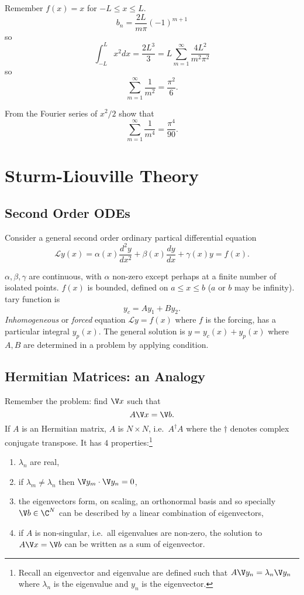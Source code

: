 \documentclass[a4paper]{article}
\renewcommand*{\L}{\mathcal{L}}
\begin{document}
\begin{eg}
  Remember \(f(x)=x\) for \(-L\leq x\leq L\).
  \[
    b_n = \frac{2L}{m\pi}(-1)^{m+1}
  \]
  so
  \[
    \int_{-L}^{L} x^2 dx = \frac{2L^3}{3} = L \sum_{m=1}^{\infty}\frac{4L^2}{m^2\pi^2}
  \]
  so
  \[
    \sum_{m=1}^{\infty}\frac{1}{m^2} = \frac{\pi^2}{6}.
  \]
\end{eg}

\begin{ex}
  From the Fourier series of \(x^2/2\) show that
  \[
    \sum_{m=1}^{\infty}\frac{1}{m^4} = \frac{\pi^4}{90}.
  \]
\end{ex}

\section{Sturm-Liouville Theory}

\subsection{Second Order ODEs}

Consider a general second order ordinary partical differential equation
\[
  \L y(x) = \alpha(x) \frac{d^2y}{dx^2} + \beta(x) \frac{dy}{dx} + \gamma(x) y = f(x).
\]

\(\alpha,\beta,\gamma\) are continuous, with \(\alpha\) non-zero except perhaps at a finite number of isolated points. \(f(x)\) is bounded, defined on \(a\leq x\leq b\) (\(a\) or \(b\) may be infinity).
tary function is \[
  y_c=Ay_1+By_2.
\]
\emph{Inhomogeneous} or \emph{forced} equation \(\L y = f(x)\) where \(f\) is the forcing, has a particular integral \(y_p(x)\). The general solution is \(y=y_c(x)+y_p(x)\) where \(A,B\) are determined in a problem by applying condition.

\subsection{Hermitian Matrices: an Analogy}

Remember the problem: find \(\V x \) such that
\[
A \V x = \V b.
\]
If \(A\) is an Hermitian matrix, \(A\) is \(N \times N\), i.e.\ \(A^\dag A\) where the \(\dag\) denotes complex conjugate transpose. It has \(4\) properties:\footnote{Recall an eigenvector and eigenvalue are defined such that \(A \V y_n = \lambda_n \V y_n\) where \(\lambda_n\) is the eigenvalue and \(y_n\) is the eigenvector.}
\begin{enumerate}
\item \(\lambda_n\) are real,
\item if \(\lambda_m\neq\lambda_n\) then \(\V y_m\cdot\V y_n=0\),
\item the eigenvectors form, on scaling, an orthonormal basis and so specially \(\V b \in \C^N\) can be described by a linear combination of eigenvectors,
\item if \(A\) is non-singular, i.e.\ all eigenvalues are non-zero, the solution to \(A\V x = \V b\) can be written as a sum of eigenvector.
\end{enumerate}
\end{document}
